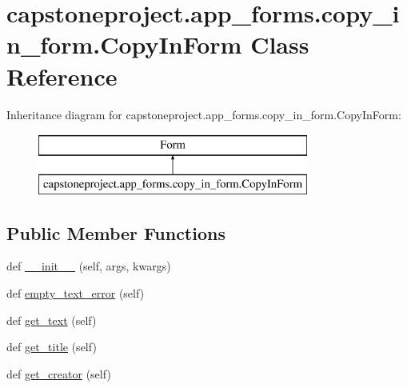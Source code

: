 \hypertarget{classcapstoneproject_1_1app__forms_1_1copy__in__form_1_1_copy_in_form}{}\section{capstoneproject.\+app\+\_\+forms.\+copy\+\_\+in\+\_\+form.\+Copy\+In\+Form Class Reference}
\label{classcapstoneproject_1_1app__forms_1_1copy__in__form_1_1_copy_in_form}
Inheritance diagram for capstoneproject.\+app\+\_\+forms.\+copy\+\_\+in\+\_\+form.\+Copy\+In\+Form\+:\begin{figure}[H]
\begin{center}
\leavevmode
\includegraphics[height=2.000000cm]{classcapstoneproject_1_1app__forms_1_1copy__in__form_1_1_copy_in_form}
\end{center}
\end{figure}
\subsection*{Public Member Functions}
\begin{DoxyCompactItemize}
\item 
def \mbox{\hyperlink{classcapstoneproject_1_1app__forms_1_1copy__in__form_1_1_copy_in_form_a4c1bc324d54f002d42acbdee9aeee8c9}{\+\_\+\+\_\+init\+\_\+\+\_\+}} (self, args, kwargs)
\item 
def \mbox{\hyperlink{classcapstoneproject_1_1app__forms_1_1copy__in__form_1_1_copy_in_form_ac24596c72f4074b6f45b3a7d83b74ac3}{empty\+\_\+text\+\_\+error}} (self)
\item 
def \mbox{\hyperlink{classcapstoneproject_1_1app__forms_1_1copy__in__form_1_1_copy_in_form_ad8c2d7657c811ea6926e287a9335031d}{get\+\_\+text}} (self)
\item 
def \mbox{\hyperlink{classcapstoneproject_1_1app__forms_1_1copy__in__form_1_1_copy_in_form_aca352dfa9ee669b58c3a5b1e7cf388be}{get\+\_\+title}} (self)
\item 
def \mbox{\hyperlink{classcapstoneproject_1_1app__forms_1_1copy__in__form_1_1_copy_in_form_a86bd20bfdb0a20cc62c2613cd500993f}{get\+\_\+creator}} (self)
\end{DoxyCompactItemize}
